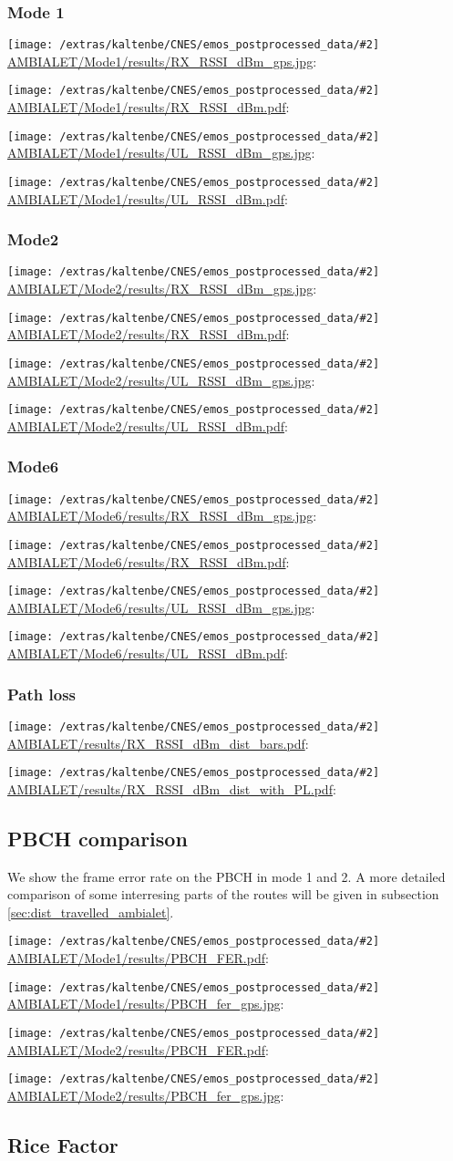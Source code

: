 \documentclass[a4paper,10pt]{article}
\newcommand{\printfile}[2][]{
 \begin{minipage}{8cm}
  \centering
  \texttt{[image: /extras/kaltenbe/CNES/emos\_postprocessed\_data/\#2]}
  \url{#2}: #1

 \end{minipage}
}
\begin{document}
\subsubsection{Mode 1}
\printfile{AMBIALET/Mode1/results/RX_RSSI_dBm_gps.jpg}
\printfile{AMBIALET/Mode1/results/RX_RSSI_dBm.pdf}

\printfile{AMBIALET/Mode1/results/UL_RSSI_dBm_gps.jpg}
\printfile{AMBIALET/Mode1/results/UL_RSSI_dBm.pdf}

\subsubsection{Mode2}

\printfile{AMBIALET/Mode2/results/RX_RSSI_dBm_gps.jpg}
\printfile{AMBIALET/Mode2/results/RX_RSSI_dBm.pdf}

\printfile{AMBIALET/Mode2/results/UL_RSSI_dBm_gps.jpg}
\printfile{AMBIALET/Mode2/results/UL_RSSI_dBm.pdf}

\subsubsection{Mode6}
\printfile{AMBIALET/Mode6/results/RX_RSSI_dBm_gps.jpg}
\printfile{AMBIALET/Mode6/results/RX_RSSI_dBm.pdf}

\printfile{AMBIALET/Mode6/results/UL_RSSI_dBm_gps.jpg}
\printfile{AMBIALET/Mode6/results/UL_RSSI_dBm.pdf}

\subsubsection{Path loss}

\printfile{AMBIALET/results/RX_RSSI_dBm_dist_bars.pdf}
\printfile{AMBIALET/results/RX_RSSI_dBm_dist_with_PL.pdf}


\subsection{PBCH comparison}
We show the frame error rate on the PBCH in mode 1 and 2. A more detailed comparison of some interresing parts of the routes will be given in subsection \ref{sec:dist_travelled_ambialet}.

\printfile{AMBIALET/Mode1/results/PBCH_FER.pdf}
\printfile{AMBIALET/Mode1/results/PBCH_fer_gps.jpg}

\printfile{AMBIALET/Mode2/results/PBCH_FER.pdf}
\printfile{AMBIALET/Mode2/results/PBCH_fer_gps.jpg}

\subsection{Rice Factor}
\end{document}
